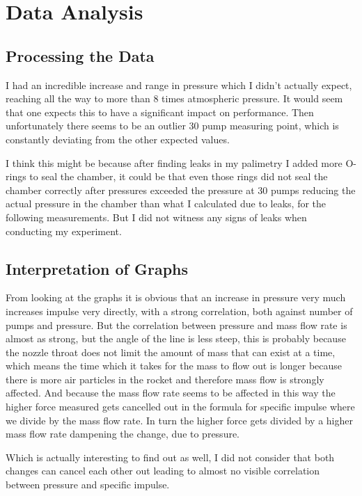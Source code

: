 \documentclass[12pt,a4paper]{article}
\begin{document}
\section{Data Analysis}

\subsection{Processing the Data}

I had an incredible increase and range in pressure which I didn't actually expect, reaching all the way to more than 8 times atmospheric pressure. It would seem that one expects this to have a significant impact on performance. Then unfortunately there seems to be an outlier 30 pump measuring point, which is constantly deviating from the other expected values.

I think this might be because after finding leaks in my palimetry I added more O-rings to seal the chamber, it could be that even those rings did not seal the chamber correctly after pressures exceeded the pressure at 30 pumps reducing the actual pressure in the chamber than what I calculated due to leaks, for the following measurements. But I did not witness any signs of leaks when conducting my experiment.

\subsection{Interpretation of Graphs}

From looking at the graphs it is obvious that an increase in pressure very much increases impulse very directly, with a strong correlation, both against number of pumps and pressure. But the correlation between pressure and mass flow rate is almost as strong, but the angle of the line is less steep, this is probably because the nozzle throat does not limit the amount of mass that can exist at a time, which means the time which it takes for the mass to flow out is longer because there is more air particles in the rocket and therefore mass flow is strongly affected. And because the mass flow rate seems to be affected in this way the higher force measured gets cancelled out in the formula for specific impulse where we divide by the mass flow rate. In turn the higher force gets divided by a higher mass flow rate dampening the change, due to pressure.

Which is actually interesting to find out as well, I did not consider that both changes can cancel each other out leading to almost no visible correlation between pressure and specific impulse.
\end{document}
